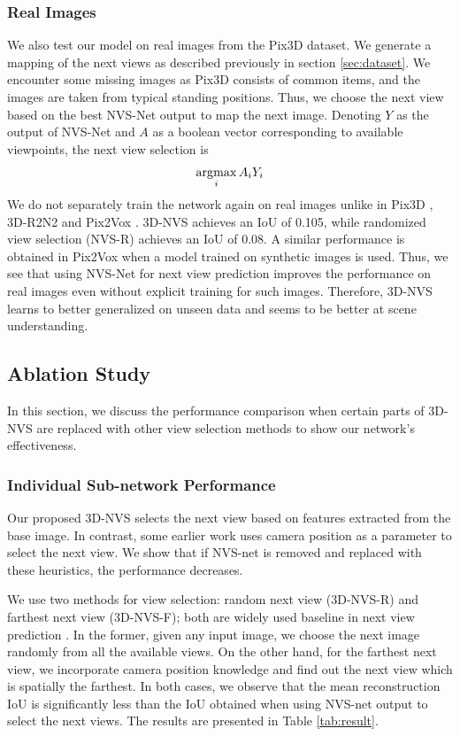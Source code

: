 \subsubsection{Real Images}
We also test our model on real images from the Pix3D dataset. We generate a mapping of the next views as described previously in section \ref{sec:dataset}. We encounter some missing images as Pix3D consists of common items, and the images are taken from typical standing positions. Thus, we choose the next view based on the best NVS-Net output to map the next image. Denoting $Y$ as the output of NVS-Net and $A$ as a boolean vector corresponding to available viewpoints, the next view selection is 
\begin{equation}
   \operatorname*{\arg\!\max}_i A_i Y_i
\end{equation}
We do not separately train the network again on real images unlike in Pix3D \cite{pix3d}, 3D-R2N2 \cite{3dr2n2} and Pix2Vox \cite{pix2vox}. 3D-NVS achieves an IoU of 0.105, while randomized view selection (NVS-R) achieves an IoU of 0.08. A similar performance is obtained in Pix2Vox when a model trained on synthetic images is used. Thus, we see that using NVS-Net for next view prediction improves the performance on real images even without explicit training for such images. Therefore, 3D-NVS learns to better generalized on unseen data and seems to be better at scene understanding.

\subsection{Ablation Study}
\label{sec:ablation}
In this section, we discuss the performance comparison when certain parts of 3D-NVS are replaced with other view selection methods to show our network's effectiveness. 
\subsubsection{Individual Sub-network Performance}
Our proposed 3D-NVS selects the next view based on features extracted from the base image. In contrast, some earlier work uses camera position as a parameter to select the next view. We show that if NVS-net is removed and replaced with these heuristics, the performance decreases.

We use two methods for view selection: random next view (3D-NVS-R) and farthest next view (3D-NVS-F); both are widely used baseline in next view prediction \cite{shapenet,yang2018active,delmerico2018comparison, hashim2019next, ly2019autonomous}. In the former, given any input image, we choose the next image randomly from all the available views. On the other hand, for the farthest next view, we incorporate camera position knowledge and find out the next view which is spatially the farthest. In both cases, we observe that the mean reconstruction IoU is significantly less than the IoU obtained when using NVS-net output to select the next views. The results are presented in Table \ref{tab:result}.

